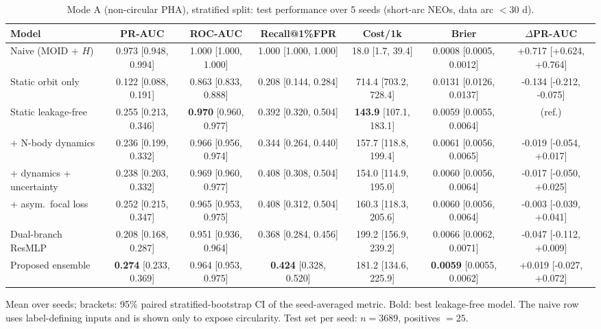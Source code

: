 \begin{table}[t]
\centering
\small
\caption{Mode A (non-circular PHA), stratified split: test performance over 5 seeds (short-arc NEOs, data arc $<30$ d).}
\label{tab:pha_stratified_short_arc}
\begin{tabular}{lcccccc}
\toprule
Model & PR-AUC & ROC-AUC & Recall@1\%FPR & Cost/1k & Brier & $\Delta$PR-AUC \\
\midrule
Naive (MOID + $H$) & 0.973 \scriptsize{[0.948, 0.994]} & 1.000 \scriptsize{[1.000, 1.000]} & 1.000 \scriptsize{[1.000, 1.000]} & 18.0 \scriptsize{[1.7, 39.4]} & 0.0008 \scriptsize{[0.0005, 0.0012]} & +0.717 \scriptsize{[+0.624, +0.764]} \\
\midrule
Static orbit only & 0.122 \scriptsize{[0.088, 0.191]} & 0.863 \scriptsize{[0.833, 0.888]} & 0.208 \scriptsize{[0.144, 0.284]} & 714.4 \scriptsize{[703.2, 728.4]} & 0.0131 \scriptsize{[0.0126, 0.0137]} & -0.134 \scriptsize{[-0.212, -0.075]} \\
Static leakage-free & 0.255 \scriptsize{[0.213, 0.346]} & \textbf{0.970} \scriptsize{[0.960, 0.977]} & 0.392 \scriptsize{[0.320, 0.504]} & \textbf{143.9} \scriptsize{[107.1, 183.1]} & 0.0059 \scriptsize{[0.0055, 0.0064]} & (ref.) \\
+ N-body dynamics & 0.236 \scriptsize{[0.199, 0.332]} & 0.966 \scriptsize{[0.956, 0.974]} & 0.344 \scriptsize{[0.264, 0.440]} & 157.7 \scriptsize{[118.8, 199.4]} & 0.0061 \scriptsize{[0.0056, 0.0065]} & -0.019 \scriptsize{[-0.054, +0.017]} \\
+ dynamics + uncertainty & 0.238 \scriptsize{[0.203, 0.332]} & 0.969 \scriptsize{[0.960, 0.977]} & 0.408 \scriptsize{[0.308, 0.504]} & 154.0 \scriptsize{[114.9, 195.0]} & 0.0060 \scriptsize{[0.0056, 0.0064]} & -0.017 \scriptsize{[-0.050, +0.025]} \\
+ asym.\ focal loss & 0.252 \scriptsize{[0.215, 0.347]} & 0.965 \scriptsize{[0.953, 0.975]} & 0.408 \scriptsize{[0.312, 0.504]} & 160.3 \scriptsize{[118.3, 205.6]} & 0.0060 \scriptsize{[0.0056, 0.0064]} & -0.003 \scriptsize{[-0.039, +0.041]} \\
Dual-branch ResMLP & 0.208 \scriptsize{[0.168, 0.287]} & 0.951 \scriptsize{[0.936, 0.964]} & 0.368 \scriptsize{[0.284, 0.456]} & 199.2 \scriptsize{[156.9, 239.2]} & 0.0066 \scriptsize{[0.0062, 0.0071]} & -0.047 \scriptsize{[-0.112, +0.009]} \\
Proposed ensemble & \textbf{0.274} \scriptsize{[0.233, 0.369]} & 0.964 \scriptsize{[0.953, 0.975]} & \textbf{0.424} \scriptsize{[0.328, 0.520]} & 181.2 \scriptsize{[134.6, 225.9]} & \textbf{0.0059} \scriptsize{[0.0055, 0.0062]} & +0.019 \scriptsize{[-0.027, +0.072]} \\
\bottomrule
\end{tabular}
\par\vspace{2pt}\footnotesize Mean over seeds; brackets: 95\% paired stratified-bootstrap CI of the seed-averaged metric. Bold: best leakage-free model. The naive row uses label-defining inputs and is shown only to expose circularity. Test set per seed: $n=3689$, positives $=25$.
\end{table}
